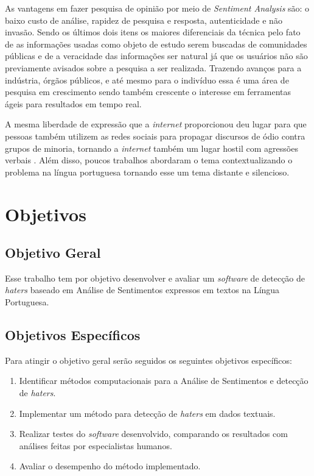 As vantagens em fazer pesquisa de opinião por meio de \textit{Sentiment Analysis} são: o baixo custo de análise, rapidez de pesquisa e resposta, autenticidade e não invasão. Sendo os últimos dois itens os maiores diferenciais da técnica pelo fato de as informações usadas como objeto de estudo serem buscadas de comunidades públicas e de a veracidade das informações ser natural já que os usuários não são previamente avisados sobre a pesquisa a ser realizada. Trazendo avanços para a indústria, órgãos públicos, e até mesmo para o indivíduo essa é uma área de pesquisa em crescimento sendo também crescente o interesse em ferramentas ágeis para resultados em tempo real. 

A mesma liberdade de expressão que a \textit{internet} proporcionou deu lugar para que pessoas também utilizem as redes sociais para propagar discursos de ódio contra grupos de minoria, tornando a \textit{internet} também um lugar hostil com agressões verbais \cite{Chetty2018}.  Além disso, poucos trabalhos abordaram o tema contextualizando o problema na língua portuguesa tornando esse um tema distante e silencioso.

\section{Objetivos}
\subsection{Objetivo Geral}    
    Esse trabalho tem por objetivo desenvolver e avaliar um \textit{software} de detecção de \textit{haters} baseado em Análise de Sentimentos expressos em textos na Língua Portuguesa. 

\subsection{Objetivos Específicos}
    Para atingir o objetivo geral serão seguidos os seguintes objetivos específicos:
\begin{enumerate}
    \item Identificar métodos computacionais para a Análise de Sentimentos e detecção de \textit{haters}.
    \item Implementar um método para detecção de \textit{haters} em dados textuais.
    \item Realizar testes do \textit{software} desenvolvido, comparando os resultados com análises feitas por especialistas humanos.
    \item Avaliar o desempenho do método implementado.
\end{enumerate}
	

